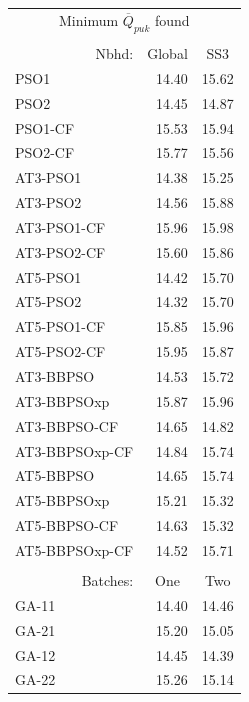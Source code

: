 \documentclass[cmbright]{staauth}
\begin{document}
\begin{table}[ht]
\centering
\begingroup\scriptsize
\begin{tabular}{l|r|r}
\multicolumn{3}{c}{Minimum $\overline{Q}_{puk}$ found}\\
\multicolumn{3}{c}{}\\
\multicolumn{1}{r}{Nbhd:} & \multicolumn{1}{c}{Global} & \multicolumn{1}{c}{SS3} \\\hline
PSO1 & 14.40 & 15.62 \\
  PSO2 & 14.45 & 14.87 \\
  PSO1-CF & 15.53 & 15.94 \\
  PSO2-CF & 15.77 & 15.56 \\
   \hline
AT3-PSO1 & 14.38 & 15.25 \\
  AT3-PSO2 & 14.56 & 15.88 \\
  AT3-PSO1-CF & 15.96 & 15.98 \\
  AT3-PSO2-CF & 15.60 & 15.86 \\
   \hline
AT5-PSO1 & 14.42 & 15.70 \\
  AT5-PSO2 & 14.32 & 15.70 \\
  AT5-PSO1-CF & 15.85 & 15.96 \\
  AT5-PSO2-CF & 15.95 & 15.87 \\
   \hline
AT3-BBPSO & 14.53 & 15.72 \\
  AT3-BBPSOxp & 15.87 & 15.96 \\
  AT3-BBPSO-CF & 14.65 & 14.82 \\
  AT3-BBPSOxp-CF & 14.84 & 15.74 \\
   \hline
AT5-BBPSO & 14.65 & 15.74 \\
  AT5-BBPSOxp & 15.21 & 15.32 \\
  AT5-BBPSO-CF & 14.63 & 15.32 \\
  AT5-BBPSOxp-CF & 14.52 & 15.71 \\
   \hline
\multicolumn{3}{c}{}\\
\multicolumn{1}{r}{Batches:} & \multicolumn{1}{c}{One} & \multicolumn{1}{c}{Two} \\\hline
GA-11 & 14.40 & 14.46 \\
  GA-21 & 15.20 & 15.05 \\
  GA-12 & 14.45 & 14.39 \\
  GA-22 & 15.26 & 15.14 \\
\hline
  \end{tabular}
\hspace{.5cm}
\begin{tabular}{l|r|r}

\end{tabular}
\end{table}
\end{document}
